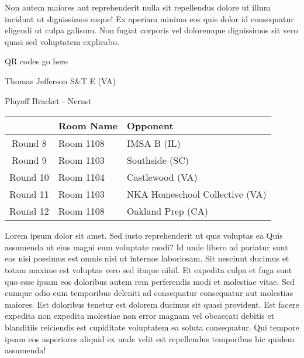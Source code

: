\documentclass{article}%
\begin{document}
\newline%
Non autem maiores aut reprehenderit nulla sit repellendus dolore ut illum incidunt ut dignissimos eaque! Ex aperiam minima eos quis dolor id consequatur eligendi ut culpa galisum. Non fugiat corporis vel doloremque dignissimos sit vero quasi sed voluptatem explicabo.\newline%
\newline%
%
\vspace*{30pt}%
\begin{center}%
\begin{Huge}%
QR codes go here%
\end{Huge}%
\end{center}%
\newpage%
\begin{center}%
\begin{Huge}%
Thomas Jefferson S\&T E (VA)%
\end{Huge}%
\vspace*{8pt}%
\linebreak%
\begin{Large}%
Playoff Bracket {-} Nernst%
\end{Large}%
\end{center}%
\begin{tabularx}{\textwidth}{|c|Y|Y|}%
\hline%
&Room Name&Opponent\\%
\hline%
Round 8&Room 1108&IMSA B (IL)\\%
Round 9&Room 1103&Southside (SC)\\%
Round 10&Room 1104&Castlewood (VA)\\%
Round 11&Room 1103&NKA Homeschool Collective (VA)\\%
Round 12&Room 1108&Oakland Prep (CA)\\%
\hline%
\end{tabularx}%
\vspace*{8pt}%
\linebreak%
\newline%
\newline%
Lorem ipsum dolor sit amet. Sed iusto reprehenderit ut quis voluptas ea Quis assumenda ut eius magni eum voluptate modi? Id unde libero ad pariatur sunt eos nisi possimus est omnis nisi ut internos laboriosam. Sit nesciunt ducimus et totam maxime est voluptas vero sed itaque nihil. Et expedita culpa et fuga sunt quo esse ipsam eos doloribus autem rem perferendis modi et molestiae vitae.\newline%
\newline%
Sed cumque odio eum temporibus deleniti ad consequatur consequatur aut molestias maiores. Est doloribus tenetur est dolorem ducimus sit quasi provident. Est facere expedita non expedita molestiae non error magnam vel obcaecati debitis et blanditiis reiciendis est cupiditate voluptatem ea soluta consequatur. Qui tempore ipsam eos asperiores aliquid ex unde velit est repellendus temporibus hic quidem assumenda!\newline%
\end{document}
